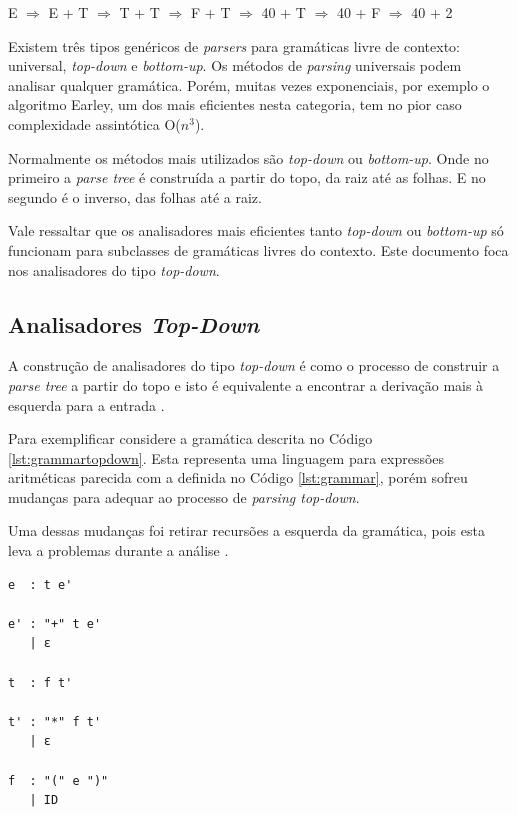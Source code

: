\begin{center}
    E $\Rightarrow$ E + T $\Rightarrow$ T + T $\Rightarrow$ F + T $\Rightarrow$ 40 + T $\Rightarrow$ 40 + F $\Rightarrow$ 40 + 2
\end{center}

Existem três tipos genéricos de \textit{parsers} para gramáticas livre de contexto: 
universal, \textit{top-down} e \textit{bottom-up}. Os métodos de \textit{parsing}
universais podem analisar qualquer gramática. Porém, muitas vezes exponenciais, por exemplo o algoritmo Earley,
um dos mais eficientes nesta categoria, tem no pior caso complexidade assintótica O($n^3$).

Normalmente os métodos mais utilizados são  \textit{top-down} ou \textit{bottom-up}. Onde no primeiro
a \textit{parse tree} é construída a partir do topo, da raiz até as folhas. E no segundo é o inverso,
das folhas até a raiz. 

Vale ressaltar que os analisadores mais eficientes tanto \textit{top-down} ou \textit{bottom-up}  
só funcionam para subclasses de gramáticas livres do contexto. Este documento foca nos analisadores
do tipo \textit{top-down}.

\subsection{Analisadores \textit{Top-Down}}

A construção de analisadores do tipo \textit{top-down} é como o processo de
construir a \textit{parse tree} a partir do topo e isto é
equivalente a encontrar a derivação mais à esquerda para a entrada \cite{aho2006}.

Para exemplificar considere a gramática descrita no Código \ref{lst:grammartopdown}. Esta
representa uma linguagem para expressões aritméticas parecida com a definida no 
Código \ref{lst:grammar}, porém sofreu mudanças para adequar ao processo de \textit{parsing top-down}.

Uma dessas mudanças foi retirar recursões a esquerda da gramática, pois esta leva a
problemas durante a análise \cite{aho2006}.

\begin{lstlisting}[caption=Exemplo de gramática para analisadores top-down onde o símbolo epsilon representa uma produção vazia.,label={lst:grammartopdown}]
e  : t e'

e' : "+" t e' 
   | ε

t  : f t'

t' : "*" f t' 
   | ε

f  : "(" e ")"
   | ID
\end{lstlisting}

